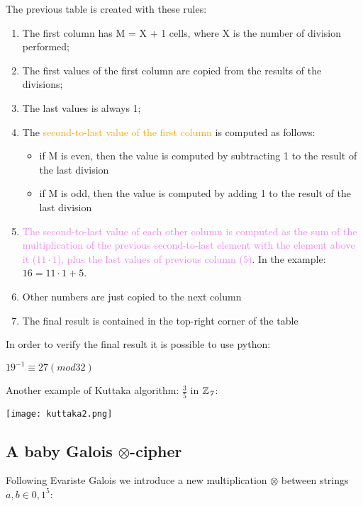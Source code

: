 \documentclass{article}
\begin{document}
The previous table is created with these rules:
\begin{enumerate}
    \item The first column has M = X + 1 cells, where X is the number of division performed;
    \item The first values of the first column are copied from the results of the divisions;
    \item The last values is always 1;
    \item The \textcolor{orange}{second-to-last value of the first column} is computed as follows:
    \begin{itemize}
        \item if M is even, then the value is computed by subtracting 1 to the \textcolor{myDarkGreen}{result of the last division}
        \item if M is odd, then the value is computed by adding 1 to the \textcolor{myDarkGreen}{result of the last division}
    \end{itemize}
    
    \item \textcolor{violet}{The second-to-last value of each other column is computed as the sum of the multiplication of the previous second-to-last element with the element above it ($11 \cdot 1$), plus the last values of previous column ($5$)}. In the example: $16 = 11 \cdot 1 + 5$.
    \item Other numbers are just copied to the next column
    \item The final result is contained in the top-right corner of the table
\end{enumerate}

In order to verify the final result it is possible to use python:
\begin{center}
    $19^{-1} \equiv 27 (mod 32)$
\end{center}

Another example of Kuttaka algorithm: $\frac{3}{5}$  in           $\mathbb{Z}\textsubscript{\textit{7}}$:

\begin{center}
\texttt{[image: kuttaka2.png]}
\end{center}



\subsection{A baby Galois $\otimes$-cipher}
Following Evariste Galois we introduce a new multiplication $\otimes$ between strings $a,b \in {0,1}^5$:
\end{document}
